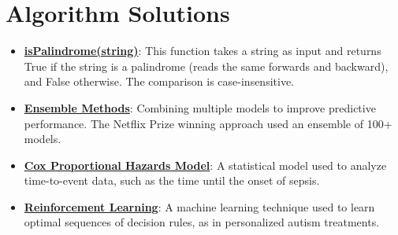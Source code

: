\documentclass{article}%
\begin{document}
%
\section{Algorithm Solutions}%
\label{sec:AlgorithmSolutions}%
\begin{itemize}[leftmargin=*]%
\item \href{https://purdue.brightspace.com/d2l/common/assets/pdfjs-d2l-dist/1.0.14-legacy/web/viewer.html?file=\%2Fcontent\%2Fenforced\%2F1095465-WL.202510.CS24200.LE1\%2F01L1-introduction.pdf\%3Fou\%3D1095465\&lang=en-us\&container=d2l-fileviewer-rendered-pdf\&fullscreen=d2l-fileviewer-rendered-pdf-dialog\&height=667#page=18}{\textbf{isPalindrome(string)}}: This function takes a string as input and returns True if the string is a palindrome (reads the same forwards and backward), and False otherwise. The comparison is case-insensitive.%
\end{itemize}%
\begin{itemize}[leftmargin=*]%
\item \href{https://purdue.brightspace.com/d2l/common/assets/pdfjs-d2l-dist/1.0.14-legacy/web/viewer.html?file=\%2Fcontent\%2Fenforced\%2F1095465-WL.202510.CS24200.LE1\%2F02L1-datas-intro.pdf\%3Fou\%3D1095465\&lang=en-us\&container=d2l-fileviewer-rendered-pdf\&fullscreen=d2l-fileviewer-rendered-pdf-dialog\&height=667#page=14}{\textbf{Ensemble Methods}}: Combining multiple models to improve predictive performance. The Netflix Prize winning approach used an ensemble of 100+ models.%
\item \href{https://purdue.brightspace.com/d2l/common/assets/pdfjs-d2l-dist/1.0.14-legacy/web/viewer.html?file=\%2Fcontent\%2Fenforced\%2F1095465-WL.202510.CS24200.LE1\%2F02L1-datas-intro.pdf\%3Fou\%3D1095465\&lang=en-us\&container=d2l-fileviewer-rendered-pdf\&fullscreen=d2l-fileviewer-rendered-pdf-dialog\&height=667#page=19}{\textbf{Cox Proportional Hazards Model}}: A statistical model used to analyze time-to-event data, such as the time until the onset of sepsis.%
\item \href{https://purdue.brightspace.com/d2l/common/assets/pdfjs-d2l-dist/1.0.14-legacy/web/viewer.html?file=\%2Fcontent\%2Fenforced\%2F1095465-WL.202510.CS24200.LE1\%2F02L1-datas-intro.pdf\%3Fou\%3D1095465\&lang=en-us\&container=d2l-fileviewer-rendered-pdf\&fullscreen=d2l-fileviewer-rendered-pdf-dialog\&height=667#page=20}{\textbf{Reinforcement Learning}}: A machine learning technique used to learn optimal sequences of decision rules, as in personalized autism treatments.%
\end{itemize}%
\end{document}
